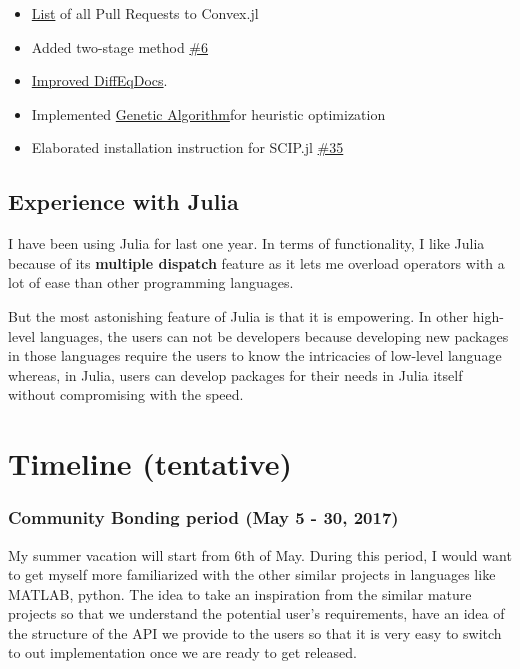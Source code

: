 \documentclass[11pt]{article}
\begin{document}
\begin{itemize}
\item
  \href{https://github.com/JuliaOpt/Convex.jl/pulls?q=is:pr+author:Ayush-iitkgp+is:closed}{List}
  of all Pull Requests to Convex.jl
\item
  Added two-stage method
  \href{https://github.com/JuliaDiffEq/DiffEqParamEstim.jl/pull/6}{\#6}
\item
  \href{https://github.com/JuliaDiffEq/DiffEqDocs.jl/pulls?q=is:pr+author:Ayush-iitkgp+is:closed}{Improved
  DiffEqDocs}.
\item
  Implemented
  \href{https://github.com/Ayush-iitkgp/Heuristic-Optimization}{Genetic
  Algorithm}for heuristic optimization
\item
  Elaborated installation instruction for SCIP.jl
  \href{https://github.com/SCIP-Interfaces/SCIP.jl/pull/35}{\#35}
\end{itemize}

\subsection{Experience with Julia}\label{experience-with-julia}

I have been using Julia for last one year. In terms of functionality, I
like Julia because of its \textbf{multiple dispatch} feature as it lets
me overload operators with a lot of ease than other programming
languages.

But the most astonishing feature of Julia is that it is empowering. In
other high-level languages, the users can not be developers because
developing new packages in those languages require the users to know the
intricacies of low-level language whereas, in Julia, users can develop
packages for their needs in Julia itself without compromising with the
speed.

    \section{Timeline (tentative)}\label{timeline-tentative}

    \subsubsection{Community Bonding period (May 5 - 30,
2017)}\label{community-bonding-period-may-5---30-2017}

My summer vacation will start from 6th of May. During this period, I
would want to get myself more familiarized with the other similar
projects in languages like MATLAB, python. The idea to take an
inspiration from the similar mature projects so that we understand the
potential user's requirements, have an idea of the structure of the API
we provide to the users so that it is very easy to switch to out
implementation once we are ready to get released.
\end{document}
